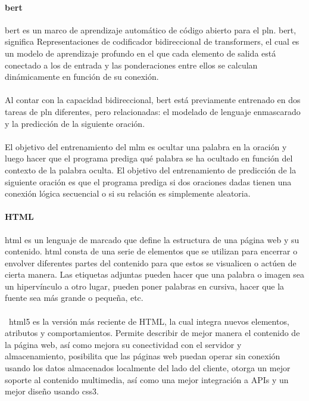 \documentclass[12pt, a4paper, titlepage]{report}
\begin{document}
		   	\paragraph{\acrshort{bert} \\}
		   	\acrfull{bert} es un marco de aprendizaje automático de código abierto para el \acrfull{pln}. \acrshort{bert}, significa Representaciones de codificador bidireccional de transformers, el cual es un modelo de aprendizaje profundo en el que cada elemento de salida está conectado a los de entrada y las ponderaciones entre ellos se calculan dinámicamente en función de su conexión. \cite{refQueesBert} \\\\        
		   	Al contar con  la capacidad bidireccional, \acrshort{bert} está previamente entrenado en dos tareas de \acrshort{pln} diferentes, pero relacionadas: el modelado de lenguaje enmascarado y la predicción de la siguiente oración.\\\\        
		   	El objetivo del entrenamiento del \acrfull{mlm} es ocultar una palabra en la oración y luego hacer que el programa prediga qué palabra se ha ocultado en función del contexto de la palabra oculta. El objetivo del entrenamiento de predicción de la siguiente oración es que el programa prediga si dos oraciones dadas tienen una conexión lógica secuencial o si su relación es simplemente aleatoria.\par
		   	
		   	\paragraph{HTML\\}
		   	
		   	\acrfull{html} es un lenguaje de marcado que define la estructura de una página web y su contenido. \acrshort{html} consta de una serie de elementos que se utilizan para encerrar o envolver diferentes partes del contenido para que estos se visualicen o actúen de cierta manera. Las etiquetas adjuntas pueden hacer que una palabra o imagen sea un hipervínculo a otro lugar, pueden poner palabras en cursiva, hacer que la fuente sea más grande o pequeña, etc. \cite{refHtml} \\\\\
		   	\acrshort{html}5 es la versión más reciente de HTML, la cual integra nuevos elementos, atributos y comportamientos. Permite describir de mejor manera el contenido de la página web, así como mejora su conectividad con el servidor y almacenamiento, posibilita que las páginas web puedan operar sin conexión usando los datos almacenados localmente del lado del cliente, otorga un mejor soporte al contenido multimedia, así como una mejor integración a APIs y un mejor diseño usando \acrshort{css}3.	\cite{refHtml2}
		   	
\end{document}

